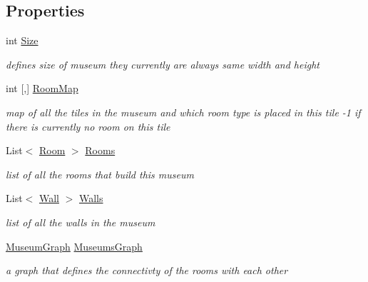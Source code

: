 \subsection*{Properties}
\begin{DoxyCompactItemize}
\item 
int \mbox{\hyperlink{class_museum_a954b0f1a64a26af54502b46c4058d99d}{Size}}
\begin{DoxyCompactList}\small\item\em defines size of museum they currently are always same width and height \end{DoxyCompactList}\item 
int \mbox{[},\mbox{]} \mbox{\hyperlink{class_museum_add7cf92391f0c501eaf2ebb76ddd54f6}{Room\+Map}}
\begin{DoxyCompactList}\small\item\em map of all the tiles in the museum and which room type is placed in this tile -\/1 if there is currently no room on this tile \end{DoxyCompactList}\item 
List$<$ \mbox{\hyperlink{class_room}{Room}} $>$ \mbox{\hyperlink{class_museum_afbe49bbdcf1b263d32fd0ae323289e7d}{Rooms}}
\begin{DoxyCompactList}\small\item\em list of all the rooms that build this museum \end{DoxyCompactList}\item 
List$<$ \mbox{\hyperlink{class_wall}{Wall}} $>$ \mbox{\hyperlink{class_museum_a4851cdf10f162bbf4b26c757874031da}{Walls}}
\begin{DoxyCompactList}\small\item\em list of all the walls in the museum \end{DoxyCompactList}\item 
\mbox{\hyperlink{class_museum_graph}{Museum\+Graph}} \mbox{\hyperlink{class_museum_abdd7abe1cc5b4de86c868edb9f3ca177}{Museums\+Graph}}
\begin{DoxyCompactList}\small\item\em a graph that defines the connectivty of the rooms with each other \end{DoxyCompactList}\item 

\end{DoxyCompactItemize}
